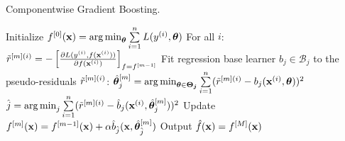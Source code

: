 
\begin{algorithm}[H]
  \begin{footnotesize}
  \begin{center}
  \caption{Componentwise Gradient Boosting.}
    \begin{algorithmic}[1]
      \State Initialize $f^{[0]}(\mathbf{x}) = \operatorname{arg\,min}_{\bm{\theta}} \sum  \limits_{i=1}^n L(y^{(i)}, \bm{\theta})$
        \State For all $i$: $\tilde{r}^{[m](i)} = -\left[\frac{\partial{L(y^{(i)}, f(\mathbf{x}^{(i)}))}}{\partial f(\mathbf{x}^{(i)})}\right]_{f=f^{[m-1]}}$
          \State Fit regression base learner $b_j \in \mathcal{B}_j$ to the pseudo-residuals $\tilde{r}^{[m](i)}$:
          \State $\hat{\bm{\theta}}^{[m]}_j = \operatorname{arg\,min}_{\bm{\theta} \in \bm{\Theta_j}} \sum  \limits_{i=1}^n 
          (\tilde{r}^{[m](i)} - b_j(\mathbf{x}^{(i)}, \bm{\theta}))^2$
        \EndFor
        \State $\hat{j} = \operatorname{arg\,min}_{j} \sum  \limits_{i=1}^n (\tilde{r}^{[m](i)} - \hat{b}_j(\mathbf{x}^{(i)}, \hat{\bm{\theta}}^{[m]}_j))^2$
        \State Update $f^{[m]}(\mathbf{x}) = f^{[m-1]}(\mathbf{x}) + \alpha \hat{b}_{\hat{j}}(\mathbf{x}, \hat{\bm{\theta}}^{[m]}_{\hat{j}})$
      \EndFor
      \State Output $\hat{f}(\mathbf{x}) = f^{[M]}(\mathbf{x})$
    \end{algorithmic}
    \end{center}
    \end{footnotesize}
\end{algorithm}
